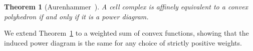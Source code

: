 \documentclass[11pt]{article}
\newcommand{\Comments}{1}
\newcommand{\mynote}[2]{\ifnum\Comments=1\textcolor{#1}{#2}\fi}
\newcommand{\raf}[1]{\mynote{darkgreen}{[RF: #1]}}
\newtheorem{theorem}{Theorem}
\begin{document}
\begin{theorem}[Aurenhammer~\cite{aurenhammer1987power}]\label{thm:aurenhammer}
	A cell complex is affinely equivalent to a convex polyhedron if and only if it is a power diagram.
\end{theorem}

We extend Theorem~\ref{thm:aurenhammer} to a weighted sum of convex functions, showing that the induced power diagram is the same for any choice of strictly positive weights.
\end{document}
